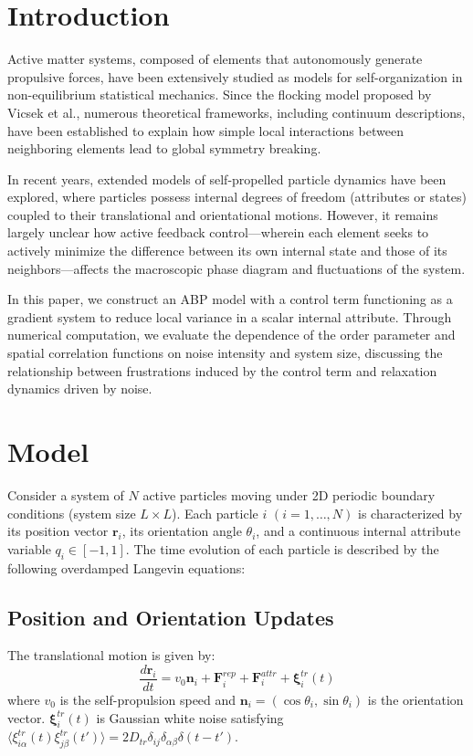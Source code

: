 \documentclass[12pt]{article}
\begin{document}
\section{Introduction}
Active matter systems, composed of elements that autonomously generate propulsive forces, have been extensively studied as models for self-organization in non-equilibrium statistical mechanics. Since the flocking model proposed by Vicsek et al.\cite{1}, numerous theoretical frameworks, including continuum descriptions\cite{2,3}, have been established to explain how simple local interactions between neighboring elements lead to global symmetry breaking.

In recent years, extended models of self-propelled particle dynamics have been explored\cite{4}, where particles possess internal degrees of freedom (attributes or states) coupled to their translational and orientational motions. However, it remains largely unclear how active feedback control—wherein each element seeks to actively minimize the difference between its own internal state and those of its neighbors—affects the macroscopic phase diagram and fluctuations of the system.

In this paper, we construct an ABP model with a control term functioning as a gradient system to reduce local variance in a scalar internal attribute. Through numerical computation, we evaluate the dependence of the order parameter and spatial correlation functions on noise intensity and system size, discussing the relationship between frustrations induced by the control term and relaxation dynamics driven by noise.

\section{Model}
Consider a system of $N$ active particles moving under 2D periodic boundary conditions (system size $L \times L$). Each particle $i$ $(i=1, \dots, N)$ is characterized by its position vector $\mathbf{r}_i$, its orientation angle $\theta_i$, and a continuous internal attribute variable $q_i \in [-1, 1]$. The time evolution of each particle is described by the following overdamped Langevin equations:

\subsection{Position and Orientation Updates}
The translational motion is given by:
\begin{equation}
\frac{d\mathbf{r}_i}{dt} = v_0 \mathbf{n}_i + \mathbf{F}_i^{rep} + \mathbf{F}_i^{attr} + \boldsymbol{\xi}_i^{tr}(t)
\end{equation}
where $v_0$ is the self-propulsion speed and $\mathbf{n}_i = (\cos \theta_i, \sin \theta_i)$ is the orientation vector. $\boldsymbol{\xi}_i^{tr}(t)$ is Gaussian white noise satisfying $\langle \xi_{i\alpha}^{tr}(t) \xi_{j\beta}^{tr}(t') \rangle = 2D_{tr} \delta_{ij} \delta_{\alpha\beta} \delta(t-t')$. 
\end{document}
